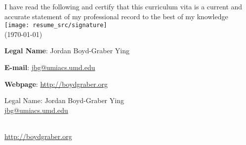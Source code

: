 \usepackage{graphicx}

\newcommand{\umdtext}[2]{
\ifumd
#1 #2
\else
#2
\fi
}


\newcommand{\image}[2]{  \begin{center}
\texttt{[image: images/\#1]}
\end{center}
  }






\ifumd
\vspace{.2cm}
  \parbox{\linewidth}{I have read the following and certify that this
  curriculum vita is a current and accurate statement of my
  professional record to the best of my
  knowledge \flushright  \texttt{[image: resume\_src/signature]} \\
\flushright  (\today{})}
\vspace{.5cm}
\fi

\ifumd


\begin{itemize*}
\item {\bf Legal Name}: Jordan Boyd-Graber Ying
\item {\bf E-mail}: \href{mailto:jbg@umiacs.umd.edu}{jbg@umiacs.umd.edu}
  \item {\bf Webpage}:  \href{http://boydgraber.org}{\url{http://boydgraber.org}}
\end{itemize*}

\else

\noindent Legal Name: Jordan Boyd-Graber Ying \\
\noindent\href{mailto:jbg@umiacs.umd.edu}{jbg@umiacs.umd.edu}
\umdtext{\\}{\bull} \href{http://boydgraber.org}{\url{http://boydgraber.org}}\\ %

\spacedhrule{0.9em}{-0.4em} %


\fi



